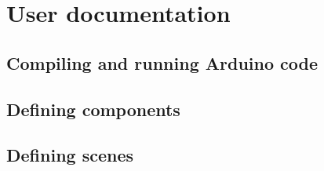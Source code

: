 \chapter{User documentation}

\section{Compiling and running Arduino code}

\section{Defining components}

\section{Defining scenes}